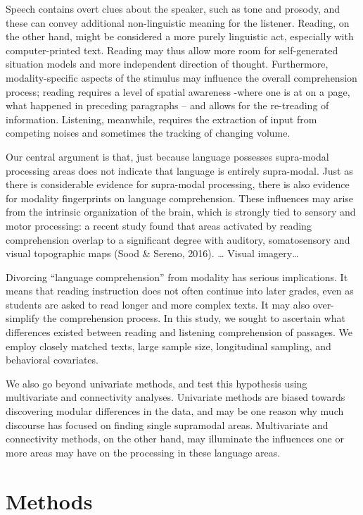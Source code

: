 Speech contains overt clues about the speaker, such as tone and prosody, and these can convey additional non-linguistic meaning for the listener. Reading, on the other hand, might be considered a more purely linguistic act, especially with computer-printed text. Reading may thus allow more room for self-generated situation models and more independent direction of thought. Furthermore, modality-specific aspects of the stimulus may influence the overall comprehension process; reading requires a level of spatial awareness -where one is at on a page, what happened in preceding paragraphs – and allows for the re-treading of information. Listening, meanwhile, requires the extraction of input from competing noises and sometimes the tracking of changing volume. 

Our central argument is that, just because language possesses supra-modal processing areas does not indicate that language is entirely supra-modal. Just as there is considerable evidence for supra-modal processing, there is also evidence for modality fingerprints on language comprehension. These influences may arise from the intrinsic organization of the brain, which is strongly tied to sensory and motor processing: a recent study found that areas activated by reading comprehension overlap to a significant degree with auditory, somatosensory and visual topographic maps (Sood \& Sereno, 2016). … Visual imagery… 

Divorcing “language comprehension” from modality has serious implications. It means that reading instruction does not often continue into later grades, even as students are asked to read longer and more complex texts. It may also over-simplify the comprehension process. 
In this study, we sought to ascertain what differences existed between reading and listening comprehension of passages. We employ closely matched texts, large sample size, longitudinal sampling, and behavioral covariates. 

We also go beyond univariate methods, and test this hypothesis using multivariate and connectivity analyses. Univariate methods are biased towards discovering modular differences in the data, and may be one reason why much discourse has focused on finding single supramodal areas. Multivariate and connectivity methods, on the other hand, may illuminate the influences one or more areas may have on the processing in these language areas. 


\section{Methods}

